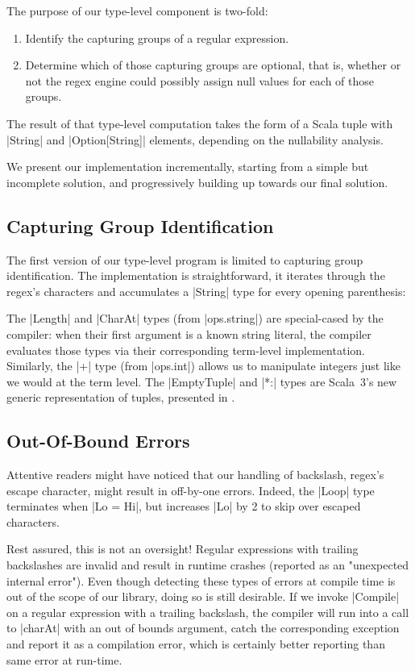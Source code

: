 The purpose of our type-level component is two-fold:

\begin{enumerate}
  \item Identify the capturing groups of a regular expression.
  \item Determine which of those capturing groups are optional, that is, whether or not the regex engine could possibly assign null values for each of those groups.
\end{enumerate}

\noindent
The result of that type-level computation takes the form of a Scala tuple with |String| and |Option[String]| elements, depending on the nullability analysis.

We present our implementation incrementally, starting from a simple but incomplete solution, and progressively building up towards our final solution.

\subsection{Capturing Group Identification}

The first version of our type-level program is limited to capturing group identification.
The implementation is straightforward, it iterates through the regex's characters and accumulates a |String| type for every opening parenthesis:

\regexFirstIteration

\noindent
The |Length| and |CharAt| types (from |ops.string|) are special-cased by the compiler: when their first argument is a known string literal, the compiler evaluates those types via their corresponding term-level implementation.
Similarly, the |+| type (from |ops.int|) allows us to manipulate integers just like we would at the term level.
The |EmptyTuple| and |*:| types are Scala~3's new generic representation of tuples, presented in .

\subsection{Out-Of-Bound Errors}

Attentive readers might have noticed that our handling of backslash, regex's escape character, might result in off-by-one errors.
Indeed, the |Loop| type terminates when |Lo = Hi|, but increases |Lo| by 2 to skip over escaped characters.

Rest assured, this is not an oversight!
Regular expressions with trailing backslashes are invalid and result in runtime crashes (reported as an "unexpected internal error").
Even though detecting these types of errors at compile time is out of the scope of our library, doing so is still desirable.
If we invoke |Compile| on a regular expression with a trailing backslash, the compiler will run into a call to |charAt| with an out of bounds argument, catch the corresponding exception and report it as a compilation error, which is certainly better reporting than same error at run-time.

